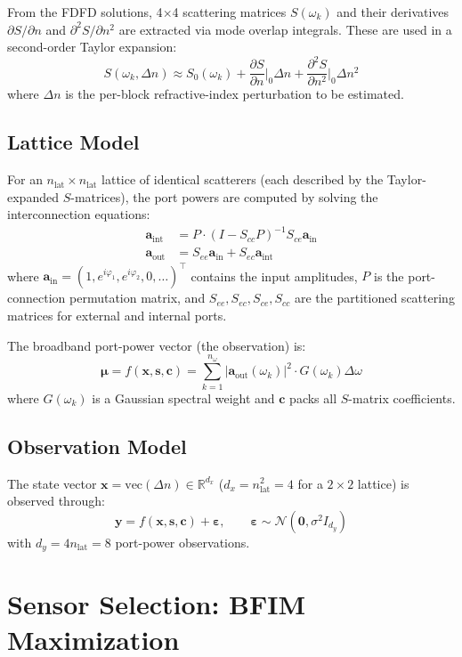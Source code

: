 \documentclass[11pt,a4paper]{article}
\newcommand{\R}{\mathbb{R}}
\begin{document}
From the FDFD solutions, 4$\times$4 scattering matrices $S(\omega_k)$ and their derivatives $\partial S/\partial n$ and $\partial^2 S/\partial n^2$ are extracted via mode overlap integrals.  These are used in a second-order Taylor expansion:
\[
  S(\omega_k, \Delta n) \approx S_0(\omega_k) + \frac{\partial S}{\partial n}\bigg|_0 \Delta n + \frac{\partial^2 S}{\partial n^2}\bigg|_0 \Delta n^2
\]
where $\Delta n$ is the per-block refractive-index perturbation to be estimated.

\subsection{Lattice Model}

For an $n_{\text{lat}} \times n_{\text{lat}}$ lattice of identical scatterers (each described by the Taylor-expanded $S$-matrices), the port powers are computed by solving the interconnection equations:
\begin{align}
  \bm{a}_{\text{int}} &= P \cdot (I - S_{cc} P)^{-1} S_{ce} \bm{a}_{\text{in}} \\
  \bm{a}_{\text{out}} &= S_{ee} \bm{a}_{\text{in}} + S_{ec} \bm{a}_{\text{int}}
\end{align}
where $\bm{a}_{\text{in}} = (1, e^{i\varphi_1}, e^{i\varphi_2}, 0, \ldots)^\top$ contains the input amplitudes, $P$ is the port-connection permutation matrix, and $S_{ee}, S_{ec}, S_{ce}, S_{cc}$ are the partitioned scattering matrices for external and internal ports.

The broadband port-power vector (the observation) is:
\[
  \bm{\mu} = f(\bm{x}, \bm{s}, \bm{c}) = \sum_{k=1}^{n_\omega} |\bm{a}_{\text{out}}(\omega_k)|^2 \cdot G(\omega_k) \Delta\omega
\]
where $G(\omega_k)$ is a Gaussian spectral weight and $\bm{c}$ packs all $S$-matrix coefficients.

\subsection{Observation Model}

The state vector $\bm{x} = \text{vec}(\Delta n) \in \R^{d_x}$ ($d_x = n_{\text{lat}}^2 = 4$ for a $2 \times 2$ lattice) is observed through:
\[
  \bm{y} = f(\bm{x}, \bm{s}, \bm{c}) + \bm{\varepsilon}, \qquad \bm{\varepsilon} \sim \mathcal{N}(\bm{0}, \sigma^2 I_{d_y})
\]
with $d_y = 4 n_{\text{lat}} = 8$ port-power observations.

\section{Sensor Selection: BFIM Maximization}
\end{document}
